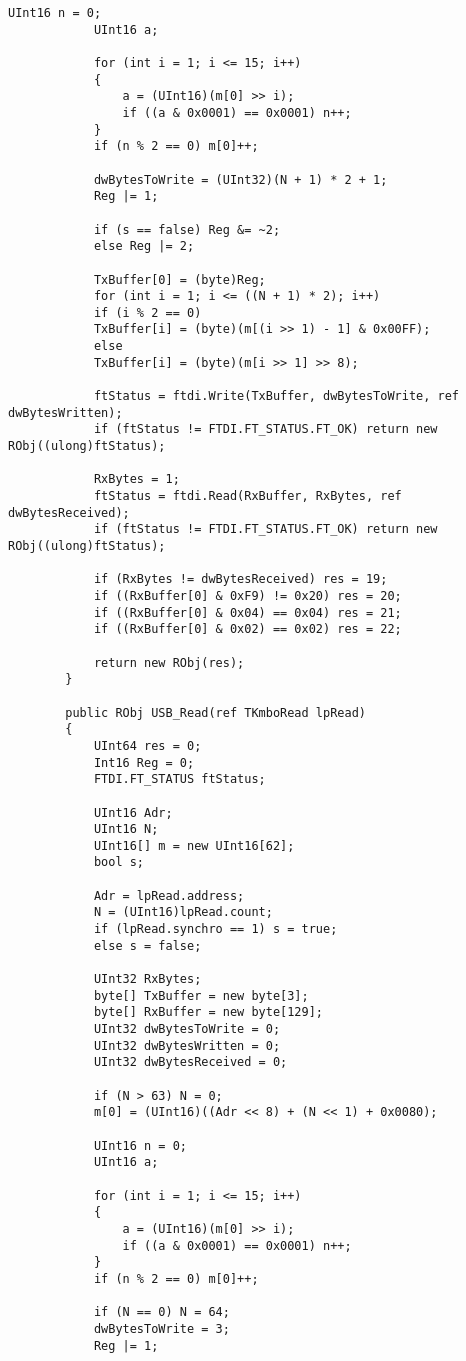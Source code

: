 \begin{lstlisting}[label=usb,caption=Основные функции взаимодействия с USB]
			UInt16 n = 0;
			UInt16 a;
			
			for (int i = 1; i <= 15; i++)               
			{
				a = (UInt16)(m[0] >> i);
				if ((a & 0x0001) == 0x0001) n++;
			}
			if (n % 2 == 0) m[0]++;
			
			dwBytesToWrite = (UInt32)(N + 1) * 2 + 1;   
			Reg |= 1;                                   
			
			if (s == false) Reg &= ~2;
			else Reg |= 2;
			
			TxBuffer[0] = (byte)Reg;
			for (int i = 1; i <= ((N + 1) * 2); i++)
			if (i % 2 == 0)
			TxBuffer[i] = (byte)(m[(i >> 1) - 1] & 0x00FF);
			else
			TxBuffer[i] = (byte)(m[i >> 1] >> 8);
			
			ftStatus = ftdi.Write(TxBuffer, dwBytesToWrite, ref dwBytesWritten);
			if (ftStatus != FTDI.FT_STATUS.FT_OK) return new RObj((ulong)ftStatus); 
			
			RxBytes = 1;
			ftStatus = ftdi.Read(RxBuffer, RxBytes, ref dwBytesReceived);
			if (ftStatus != FTDI.FT_STATUS.FT_OK) return new RObj((ulong)ftStatus);
			
			if (RxBytes != dwBytesReceived) res = 19;   
			if ((RxBuffer[0] & 0xF9) != 0x20) res = 20; 
			if ((RxBuffer[0] & 0x04) == 0x04) res = 21; 
			if ((RxBuffer[0] & 0x02) == 0x02) res = 22; 
			
			return new RObj(res);
		}
		
		public RObj USB_Read(ref TKmboRead lpRead)
		{
			UInt64 res = 0;
			Int16 Reg = 0;
			FTDI.FT_STATUS ftStatus;
			
			UInt16 Adr;
			UInt16 N;
			UInt16[] m = new UInt16[62];
			bool s;
			
			Adr = lpRead.address;
			N = (UInt16)lpRead.count;
			if (lpRead.synchro == 1) s = true;
			else s = false;
			
			UInt32 RxBytes;                             
			byte[] TxBuffer = new byte[3];              
			byte[] RxBuffer = new byte[129];           
			UInt32 dwBytesToWrite = 0;                 
			UInt32 dwBytesWritten = 0;                  
			UInt32 dwBytesReceived = 0;                 
			
			if (N > 63) N = 0;
			m[0] = (UInt16)((Adr << 8) + (N << 1) + 0x0080);
			
			UInt16 n = 0;
			UInt16 a;
			
			for (int i = 1; i <= 15; i++)               
			{
				a = (UInt16)(m[0] >> i);
				if ((a & 0x0001) == 0x0001) n++;
			}
			if (n % 2 == 0) m[0]++;
			
			if (N == 0) N = 64;
			dwBytesToWrite = 3;                         
			Reg |= 1;                                   
			

\end{lstlisting}
